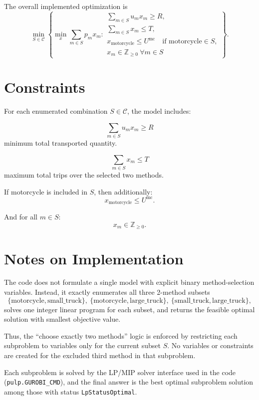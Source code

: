 The overall implemented optimization is
\[
\min_{S \in \mathcal{C}}
\left\{
\min_{x}
\sum_{m \in S} p_m x_m
:
\begin{array}{l}
\sum_{m \in S} u_m x_m \ge R,\\[2mm]
\sum_{m \in S} x_m \le T,\\[2mm]
x_{\text{motorcycle}} \le U^{\text{mc}} \quad \text{if } \text{motorcycle}\in S,\\[1mm]
x_m \in \mathbb{Z}_{\ge 0}\ \forall m\in S
\end{array}
\right\}.
\]

\section*{Constraints}

For each enumerated combination \(S \in \mathcal{C}\), the model includes:

\[
\sum_{m \in S} u_m x_m \ge R
\]
minimum total transported quantity.

\[
\sum_{m \in S} x_m \le T
\]
maximum total trips over the selected two methods.

If motorcycle is included in \(S\), then additionally:
\[
x_{\text{motorcycle}} \le U^{\text{mc}}.
\]

And for all \(m \in S\):
\[
x_m \in \mathbb{Z}_{\ge 0}.
\]

\section*{Notes on Implementation}

The code does not formulate a single model with explicit binary method-selection variables. Instead, it exactly enumerates all three 2-method subsets
\[
\{\text{motorcycle},\text{small\_truck}\},\ 
\{\text{motorcycle},\text{large\_truck}\},\ 
\{\text{small\_truck},\text{large\_truck}\},
\]
solves one integer linear program for each subset, and returns the feasible optimal solution with smallest objective value.

Thus, the ``choose exactly two methods'' logic is enforced by restricting each subproblem to variables only for the current subset \(S\). No variables or constraints are created for the excluded third method in that subproblem.

Each subproblem is solved by the LP/MIP solver interface used in the code (\texttt{pulp.GUROBI\_CMD}), and the final answer is the best optimal subproblem solution among those with status \texttt{LpStatusOptimal}.
